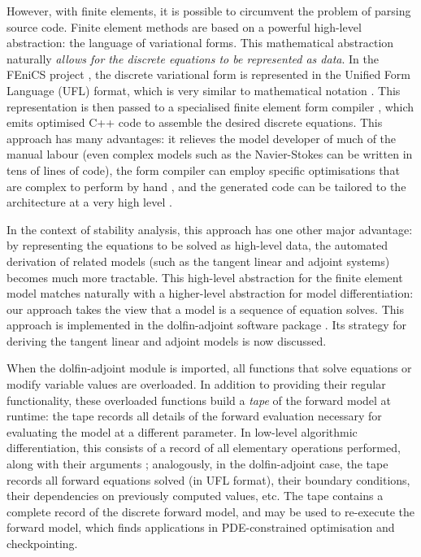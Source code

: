 \documentclass{siamltex}
\begin{document}
However, with finite elements, it is possible to circumvent the problem of parsing source code. Finite element methods
are based on a powerful high-level abstraction: the language of variational forms. 
This mathematical abstraction naturally \emph{allows for the discrete
equations to be represented as data}. In the FEniCS project
\cite{logg2011}, the discrete variational form is represented in the Unified Form
Language (UFL) format, which is very similar to mathematical notation \cite{alnaes2011,alnaes2012}. This representation is then passed to a specialised finite element
form compiler \cite{kirby2006}, which emits optimised C++ code to assemble the desired discrete equations.
This approach has many advantages: it relieves the model developer of much of the manual labour (even complex
models such as the Navier-Stokes can be written in tens of lines of code), the form compiler can employ
specific optimisations that are complex to perform by hand \cite{olgaard2010}, and the generated code
can be tailored to the architecture at a very high level \cite{markall2012}.

In the context of stability analysis, this approach has one other major advantage: by representing the equations
to be solved as high-level data, the automated derivation of related models (such as the tangent linear and adjoint
systems) becomes much more tractable. This high-level abstraction for the finite element model matches naturally with a higher-level abstraction
for model differentiation: our approach takes the view that a model is a sequence of equation solves.
This approach is implemented in the dolfin-adjoint software package \cite{farrell2012b}. Its strategy for deriving the tangent
linear and adjoint models is now discussed.

When the dolfin-adjoint module is imported, all functions that solve equations or modify variable values are overloaded. 
In addition to providing their regular functionality, these overloaded functions build
a \emph{tape} of the forward model at runtime: the tape records all details of the forward evaluation necessary for
evaluating the model at a different parameter. In low-level algorithmic differentiation, this consists of
a record of all elementary operations performed, along with their arguments \cite{griewank2008}; analogously, in the dolfin-adjoint case,
the tape records all forward equations solved (in UFL format), their boundary conditions, their dependencies on previously computed values, etc.
The tape contains a complete record of the discrete forward model, and may be used to re-execute the forward model, which
finds applications in PDE-constrained optimisation and checkpointing.
\end{document}
